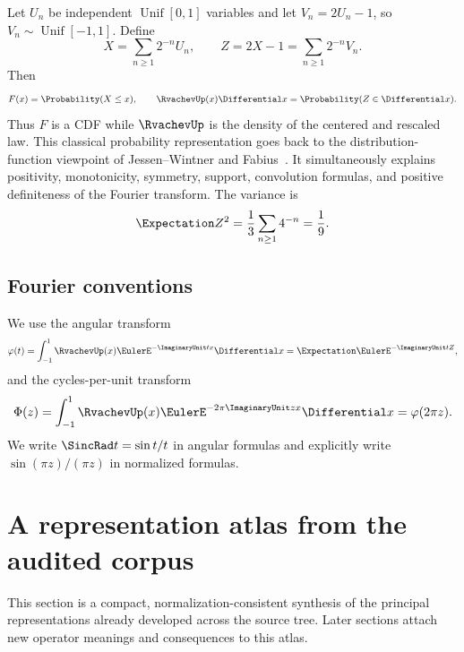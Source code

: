 \documentclass[11pt]{article}
\theoremstyle{definition}
\theoremstyle{remark}
\newcommand{\PhiF}{\Phi}
\newcommand{\phiF}{\varphi}
\begin{document}
Let \(U_n\) be independent \(\operatorname{Unif}[0,1]\) variables and let
\(V_n=2U_n-1\), so \(V_n\sim\operatorname{Unif}[-1,1]\).  Define
\begin{equation}
 X=\sum_{n\ge1}2^{-n}U_n,
 \qquad
 Z=2X-1=\sum_{n\ge1}2^{-n}V_n.
 \label{p4:eq:random-series}
\end{equation}
Then
\begin{equation}
 F(x)=\Probability(X\le x),\qquad \RvachevUp(x)\Differential x=\Probability(Z\in\Differential x).
 \label{p4:eq:cdf-density}
\end{equation}
Thus \(F\) is a CDF while \(\RvachevUp\) is the density of the centered and rescaled law.
This classical probability representation goes back to the distribution-function viewpoint of
Jessen--Wintner and Fabius~\cite{p4:JessenWintner1935,p4:Fabius1966}.  It simultaneously explains positivity, monotonicity, symmetry,
support, convolution formulas, and positive definiteness of the Fourier transform.
The variance is
\begin{equation}
 \Expectation Z^2=\frac13\sum_{n\ge1}4^{-n}=\frac19.
 \label{p4:eq:variance}
\end{equation}

\subsection{Fourier conventions}

We use the angular transform
\begin{equation}
 \phiF(t)=\int_{-1}^{1}\RvachevUp(x)\EulerE^{-\ImaginaryUnit tx}\Differential x=\Expectation\EulerE^{-\ImaginaryUnit tZ},
 \label{p4:eq:angular-transform}
\end{equation}
and the cycles-per-unit transform
\begin{equation}
 \PhiF(z)=\int_{-1}^{1}\RvachevUp(x)\EulerE^{-2\pi\ImaginaryUnit zx}\Differential x=\phiF(2\pi z).
 \label{p4:eq:normalized-transform}
\end{equation}
We write \(\SincRad t=\sin t/t\) in angular formulas and explicitly write
\(\sin(\pi z)/(\pi z)\) in normalized formulas.

\section{A representation atlas from the audited corpus}
\label{p4:sec:atlas}

This section is a compact, normalization-consistent synthesis of the principal
representations already developed across the source tree.  Later sections attach new
operator meanings and consequences to this atlas.
\end{document}
